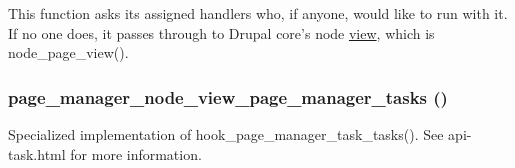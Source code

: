 This function asks its assigned handlers who, if anyone, would like to run with it. If no one does, it passes through to Drupal core's node \hyperlink{classview}{view}, which is node\_\-page\_\-view(). \hypertarget{node__view_8inc_a981d1e2a2df349abcc15a7854063d01a}{
\subsubsection[{page\_\-manager\_\-node\_\-view\_\-page\_\-manager\_\-tasks}]{\setlength{\rightskip}{0pt plus 5cm}page\_\-manager\_\-node\_\-view\_\-page\_\-manager\_\-tasks ()}}
\label{node__view_8inc_a981d1e2a2df349abcc15a7854063d01a}
Specialized implementation of hook\_\-page\_\-manager\_\-task\_\-tasks(). See api-\/task.html for more information. 